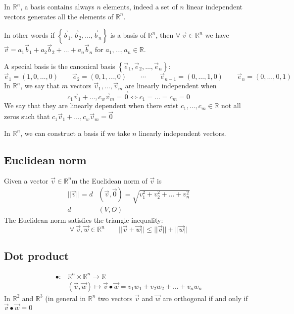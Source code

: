 In $\mathbb{R}^n$, a basis contains always $n$ elements, indeed a set of $n$ linear independent vectors generates all the elements of $\mathbb{R}^n$. 

In other words if $\left\{ \vec b_1, \vec b_2, \dots, \vec b_n \right\}$ is a basis of $\mathbb{R}^n$, then $\forall \ \vec v \in \mathbb{R}^n$ we have $\vec v = a_1 \vec b_1 +a_2 \vec b_2 + \dots + a_n \vec b_n$ for $a_1, \dots, a_n \in \mathbb{R}$.

A special basis is the canonical basis $\left\{ \vec e_1, \vec e_2, \dots, \vec e_n \right\}$:
$$\vec e_1 = (1,0,\dots,0) \qquad\vec e_2 = (0,1,\dots,0) \qquad \cdots \qquad \vec e_{n-1} = (0,\dots,1,0) \qquad \vec e_{n} = (0,\dots,0,1)$$
In $\mathbb{R}^n$, we say that $m$ vectors $\vec v_1, \dots, \vec v_m$ are linearly independent when
$$c_1 \vec v_1 + \dots, c_w \vec v_m = \vec 0 \iff c_1 = \dots = c_m = 0$$
We say that they are linearly dependent when there exist $c_1, \dots, c_m \in \mathbb{R}$ not all zeros such that $c_1 \vec v_1 + \dots, c_w \vec v_m = \vec 0$ 

In $\mathbb{R}^n$, we can construct a basis if we take $n$ linearly independent vectors.
\subsection{Euclidean norm}
Given a vector $\vec v \in \mathbb{R}^n$m the Euclidean norm of $\vec v$ is
\begin{align*}
    ||\vec v|| = d&(\vec v, \vec 0) = \sqrt{v^2_1 + v^2_2 + \dots + v^2_n} \\
    d&(V,O)
\end{align*}
The Euclidean norm satisfies the triangle inequality:
$$\forall \ \vec v, \vec w \in \mathbb{R}^n \qquad ||\vec v + \vec w|| \le || \vec v||  + ||\vec w||$$
\subsection{Dot product}
\begin{align*}
    \bullet : &\mathbb{R}^n \times \mathbb{R}^n \longrightarrow \mathbb{R} \\
    &\left(\vec v, \vec w\right) \longmapsto \vec v \bullet \vec w =  v_1 w_1 +  v_2 w_2 + \dots + v_n w_n 
\end{align*}
In $\mathbb{R}^2$ and $\mathbb{R}^3$ (in general in $\mathbb{R}^n$ two vectors $\vec v$ and $\vec w$ are orthogonal if and only if $\vec v \bullet \vec w = 0$
